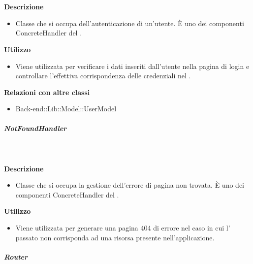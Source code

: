 				\textbf{\\ \\ Descrizione} 
					\begin{itemize}
						\item[] Classe che si occupa dell'autenticazione di un'utente. È uno dei componenti ConcreteHandler del  .
					\end{itemize}      
				\textbf{Utilizzo}  
					\begin{itemize}
						\item[] Viene utilizzata per verificare i dati inseriti dall'utente nella pagina di login e controllare l'effettiva corrispondenza delle credenziali nel .
					\end{itemize}
					\textbf{Relazioni con altre classi}
					\begin{itemize}
							\item{Back-end::Lib::Model::UserModel}
					\end{itemize}
			\subparagraph{NotFoundHandler}
				
				\textbf{\\ \\ Descrizione} 
					\begin{itemize}
						\item[] Classe che si occupa la gestione dell'errore di pagina non trovata. È uno dei componenti ConcreteHandler del  .
					\end{itemize}      
				\textbf{Utilizzo}  
					\begin{itemize}
						\item[] Viene utilizzata per generare una pagina 404 di errore nel caso in cui l' passato non corrisponda ad una risorsa presente nell'applicazione.
					\end{itemize}
			\subparagraph{Router}
				
